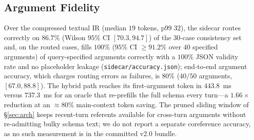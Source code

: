 \documentclass[10pt,conference]{IEEEtran}
\newcommand{\code}[1]{\texttt{\small #1}}
\begin{document}
\subsection{Argument Fidelity}
Over the compressed textual IR (median $19$ tokens, p99 $32$), the sidecar routes correctly on
$86.7\%$ (Wilson $95\%$ CI $[70.3, 94.7]$) of the $30$-case consistency set and, on the routed
cases, fills $100\%$ ($95\%$ CI ${\ge}91.2\%$ over $40$ specified arguments) of query-specified
arguments correctly with a $100\%$ JSON validity rate and no placeholder leakage
(\code{sidecar/accuracy.json}); end-to-end argument accuracy, which charges routing errors as
failures, is $80\%$ ($40/50$ arguments, $[67.0, 88.8]$). The hybrid path reaches its first-argument token in $443.8$~ms versus
$737.3$~ms for an oracle that re-prefills the full schema every turn---a $1.66\times$ reduction
at an $\approx 80\%$ main-context token saving. The pruned sliding window of \S\ref{sec:arch}
keeps recent-turn referents available for cross-turn arguments without re-admitting bulky schema
text; we do not report a separate coreference accuracy, as no such measurement is in the committed
v2.0 bundle.
\end{document}
